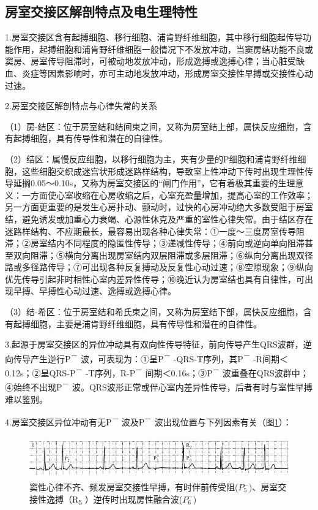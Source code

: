 \subsection{房室交接区解剖特点及电生理特性}

1.房室交接区含有起搏细胞、移行细胞、浦肯野纤维细胞，其中移行细胞起传导功能作用，起搏细胞和浦肯野纤维细胞一般情况下不发放冲动，当窦房结功能不良或窦房、房室传导阻滞时，可被动地发放冲动，形成逸搏或逸搏心律；当心脏受缺血、炎症等因素影响时，亦可主动地发放冲动，形成房室交接性早搏或交接性心动过速。

2.房室交接区解剖特点与心律失常的关系

（1）房-结区：位于房室结和结间束之间，又称为房室结上部，属快反应细胞，含有起搏细胞，具有传导性和潜在的自律性。

（2）结区：属慢反应细胞，以移行细胞为主，夹有少量的P细胞和浦肯野纤维细胞，这些细胞交织成迷宫状形成迷路样结构，导致室上性冲动下传时出现生理性传导延搁0.05～0.10s，又称为房室交接区的“闸门作用”，它有着极其重要的生理意义：一方面使心室收缩在心房收缩之后，心室充盈量增加，提高心室的工作效率；另一方面更重要的是发生心房扑动、颤动时，过快的心房冲动绝大多数受阻于房室结，避免诱发或加重心力衰竭、心源性休克及严重的室性心律失常。由于结区存在迷路样结构、不应期最长，最容易出现各种心律失常：①一度～三度房室传导阻滞；②房室结内不同程度的隐匿性传导；③递减性传导；④前向或逆向单向阻滞甚至双向阻滞；⑤横向分离出现房室结内双层阻滞或多层阻滞；⑥纵向分离出现双径路或多径路传导；⑦可出现各种反复搏动及反复性心动过速；⑧空隙现象；⑨纵向优先传导引起非时相性心室内差异性传导；⑩晚近认为房室结也具有自律性，可出现早搏、早搏性心动过速、逸搏或逸搏心律。

（3）结-希区：位于房室结和希氏束之间，又称为房室结下部，属快反应细胞，含有起搏细胞，主要是浦肯野纤维细胞，具有传导性和潜在的自律性。

3.起源于房室交接区的异位冲动具有双向性传导特征，前向传导产生QRS波群，逆向传导产生逆行P\textsuperscript{－}
波，可表现为：①呈P\textsuperscript{－}
-QRS-T序列，其P\textsuperscript{－}
-R间期＜0.12s；②呈QRS-P\textsuperscript{－}
-T序列，R-P\textsuperscript{－} 间期＜0.16s；③P\textsuperscript{－}
波重叠在QRS波群中；④始终不出现P\textsuperscript{－}
波。QRS波形正常或伴心室内差异性传导，后者有时与室性早搏难以鉴别。

4.房室交接区异位冲动有无P\textsuperscript{－} 波及P\textsuperscript{－}
波出现位置与下列因素有关（图\ref{fig14-6}）：

\begin{figure}[!htbp]
 \centering
 \includegraphics[width=5.58333in,height=0.70833in]{./images/Image00250.jpg}
 \captionsetup{justification=centering}
 \caption{窦性心律不齐、频发房室交接性早搏，有时伴前传受阻($P_5^-$)、房室交接性逸搏（R\textsubscript{5}
 ）逆传时出现房性融合波($P_6^-$)}
 \label{fig14-6}
  \end{figure} 


